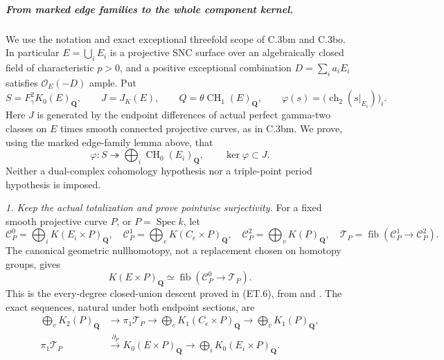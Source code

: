 \subparagraph{From marked edge families to the whole component kernel.}
We use the notation and exact exceptional threefold scope of C.3bm and
C.3bo.  In particular $E=\bigcup_iE_i$ is a projective SNC surface over
an algebraically closed field of characteristic $p>0$, and a positive
exceptional combination $D=\sum_i a_iE_i$ satisfies
$\mathcal O_E(-D)$ ample.  Put
\[
 S=F_\gamma^2K_0(E)_{\mathbf Q},\qquad J=J_K(E),\qquad
 Q=\theta\operatorname{CH}_1(E)_{\mathbf Q},\qquad
 \varphi(s)=\bigl(\operatorname{ch}_2(s|_{E_i})\bigr)_i.
\]
Here $J$ is generated by the endpoint differences of actual perfect
gamma-two classes on $E$ times smooth connected projective curves, as
in C.3bm.  We prove, using the marked edge-family lemma above, that
\begin{equation}
 \varphi:S\twoheadrightarrow\bigoplus_i\operatorname{CH}_0(E_i)_{\mathbf Q},
 \qquad \ker\varphi\subset J.                         \tag{UK.1}
\end{equation}
Neither a dual-complex cohomology hypothesis nor a triple-point period
hypothesis is imposed.

\emph{1. Keep the actual totalization and prove pointwise surjectivity.}
For a fixed smooth projective curve $P$, or $P=\operatorname{Spec}k$,
let
\[
 \mathcal C_P^0=\bigoplus_iK(E_i\times P)_{\mathbf Q},\quad
 \mathcal C_P^1=\bigoplus_eK(C_e\times P)_{\mathbf Q},\quad
 \mathcal C_P^2=\bigoplus_vK(P)_{\mathbf Q},\quad
 \mathcal T_P=\operatorname{fib}(\mathcal C_P^1\to\mathcal C_P^2).
\]
The canonical geometric nullhomotopy, not a replacement chosen on
homotopy groups, gives
\begin{equation}
 K(E\times P)_{\mathbf Q}\simeq
          \operatorname{fib}(\mathcal C_P^0\to\mathcal T_P).
                                                               \tag{UK.2}
\end{equation}
This is the every-degree closed-union descent proved in (ET.6), from
\citet[Theorems A and C, printed pp.~29--30]{rootGeisserHesselholt2011}
and \citet[Theorem 8.1 and proof, p.~367]{D_ThomasonTrobaugh1990}.
The exact sequences, natural under both endpoint sections, are
\begin{align}
 \bigoplus_vK_2(P)_{\mathbf Q}&\longrightarrow\pi_1\mathcal T_P
 \longrightarrow\bigoplus_eK_1(C_e\times P)_{\mathbf Q}
 \longrightarrow\bigoplus_vK_1(P)_{\mathbf Q},             \tag{UK.3}\\
 \pi_1\mathcal T_P&\xrightarrow{\partial_P}K_0(E\times P)_{\mathbf Q}
 \longrightarrow\bigoplus_iK_0(E_i\times P)_{\mathbf Q}.
                                                               \tag{UK.4}
\end{align}

